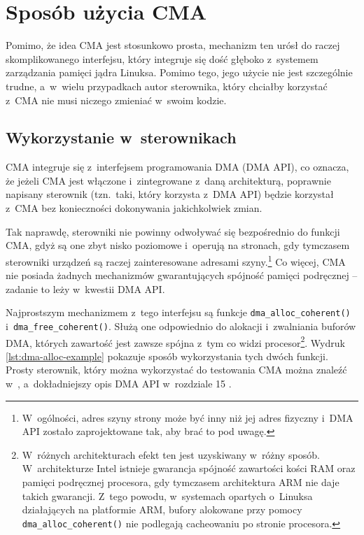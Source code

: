 \chapter{Sposób użycia CMA}\label{sec:cma-usage}

Pomimo, że idea CMA jest stosunkowo prosta, mechanizm ten urósł do
raczej skomplikowanego interfejsu, który integruje się dość głęboko
z~systemem zarządzania pamięci jądra Linuksa.  Pomimo tego, jego
użycie nie jest szczególnie trudne, a~w~wielu przypadkach autor
sterownika, który chciałby korzystać z~CMA nie musi niczego zmieniać
w~swoim kodzie.

\section{Wykorzystanie w~sterownikach}\label{sec:usage-drivers}

CMA integruje się z~interfejsem programowania DMA (DMA API), co
oznacza, że jeżeli CMA jest włączone i~zintegrowane z~daną
architekturą, poprawnie napisany sterownik (tzn.\ taki, który korzysta
z~DMA API) będzie korzystał z~CMA bez konieczności dokonywania
jakichkolwiek zmian.

Tak naprawdę, sterowniki nie powinny odwoływać się bezpośrednio do
funkcji CMA, gdyż są one zbyt nisko poziomowe i~operują na stronach,
gdy tymczasem sterowniki urządzeń są raczej zainteresowane adresami
szyny.\footnote{W~ogólności, adres szyny strony może być inny niż jej
  adres fizyczny i~DMA API zostało zaprojektowane tak, aby brać to pod
  uwagę.}  Co więcej, CMA nie posiada żadnych mechanizmów
gwarantujących spójność pamięci podręcznej -- zadanie to leży
w~kwestii DMA API.

Najprostszym mechanizmem z~tego interfejsu są funkcje
\lstinline|dma_alloc_coherent()| i~\lstinline|dma_free_coherent()|.
Służą one odpowiednio do alokacji i~zwalniania buforów DMA, których
zawartość jest zawsze spójna z~tym co widzi
procesor\footnote{W~różnych architekturach efekt ten jest uzyskiwany
  w~różny sposób.  W~architekturze Intel istnieje gwarancja spójność
  zawartości kości RAM oraz pamięci podręcznej procesora, gdy tymczasem
  architektura ARM nie daje takich gwarancji.  Z~tego powodu,
  w~systemach opartych o~Linuksa działających na platformie ARM,
  bufory alokowane przy pomocy \lstinline|dma_alloc_coherent()| nie
  podlegają cacheowaniu  po stronie procesora.}.  Wydruk
\ref{lst:dma-alloc-example} pokazuje sposób wykorzystania tych dwóch
funkcji.  Prosty sterownik, który można wykorzystać do testowania CMA
można znaleźć w~\cite{patch:cma-test}, a~dokładniejszy opis DMA API
w~rozdziale 15 \cite{bib:ldd3}.


